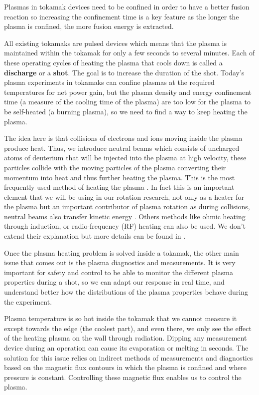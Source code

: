 \documentclass[12pt,lot, lof]{puthesis}
\begin{document}
Plasmas in tokamak devices need to be confined in order to have a better fusion reaction so increasing the confinement time is a key feature as the longer the plasma is confined, the more fusion energy is extracted. 

All existing tokamaks are pulsed devices which means that the plasma is maintained within the tokamak for only a few seconds to several minutes. Each of these operating cycles of heating the plasma that cools down is called a \textbf{discharge} or a \textbf{shot}. The goal is to increase the duration of the shot. Today's plasma experiments in tokamaks can confine plasmas at the required temperatures for net power gain, but the plasma density and energy confinement time (a measure of the cooling time of the plasma) are too low for the plasma to be self-heated (a burning plasma), so we need to find a way to keep heating the plasma.

The idea here is that collisions of electrons and ions moving inside the plasma produce heat. Thus, we introduce neutral beams which consists of uncharged atoms of deuterium that will be injected into the plasma at high velocity, these particles collide with the moving particles of the plasma converting their momentum into heat and thus further heating the plasma. This is the most frequently used method of heating the plasma \cite{Stix72, Wagner82, Kaye85, Strachan87}. In fact this is an important element that we will be using in our rotation research, not only as a heater for the plasma but an important contributor of plasma rotation as during collisions, neutral beams also transfer kinetic energy \cite{Suckewer79, Suckewer81, Strait07}. Others methods like ohmic heating through induction, or radio-frequency (RF) heating can also be used. We don't extend their explanation but more details can be found in \cite{Stix75, Fisch78, Kubo83, Goldston84}. 

Once the plasma heating problem is solved inside a tokamak, the other main issue that comes out is the plasma diagnostics and measurements. It is very important for safety and control to be able to monitor the different plasma properties during a shot, so we can adapt our response in real time, and understand better how the distributions of the plasma properties behave during the experiment.

Plasma temperature is so hot inside the tokamak that we cannot measure it except towards the edge (the coolest part), and even there, we only see the effect of the heating plasma on the wall through radiation. Dipping any measurement device during an operation can cause its evaporation or melting in seconds.
The solution for this issue relies on indirect methods of measurements and diagnostics based on the magnetic flux contours in which the plasma is confined and where pressure is constant. Controlling  these magnetic flux enables us to control the plasma. 
\end{document}
